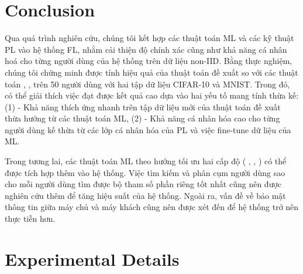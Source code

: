 \documentclass[runningheads]{llncs}
\begin{document}
\section{Conclusion}

Qua quá trình nghiên cứu, chúng tôi kết hợp các thuật toán ML và các kỹ thuật PL vào hệ thống FL, nhằm cải thiện độ chính xác cũng như khả năng cá nhân hoá cho từng người dùng của hệ thống trên dữ liệu non-IID. Bằng thực nghiệm, chúng tôi chứng minh được tính hiệu quả của thuật toán đề xuất  so với các thuật toán , ,  trên 50 người dùng với hai tập dữ liệu CIFAR-10 và MNIST. Trong đó, có thể giải thích việc đạt được kết quả cao dựa vào hai yếu tố mang tính thừa kế: (1) - Khả năng thích ứng nhanh trên tập dữ liệu mới của thuật toán đề xuất thừa hưởng từ các thuật toán ML, (2) - Khả năng cá nhân hóa cao cho từng người dùng kế thừa từ các lớp cá nhân hóa của PL và việc fine-tune dữ liệu của ML.

Trong tương lai, các thuật toán ML theo hướng tối ưu hai cấp độ ( \cite{finn2017model},  \cite{rajeswaran2019meta}, ) có thể được tích hợp thêm vào hệ thống. Việc tìm kiếm và phân cụm người dùng sao cho mỗi người dùng tìm được bộ tham số phần riêng tốt nhất cũng nên được nghiên cứu thêm để tăng hiệu suất của hệ thống. Ngoài ra, vấn đề về bảo mật thông tin giữa máy chủ và máy khách cũng nên được xét đến để hệ thống trở nên thực tiễn hơn.

%
%
%
%
%



\appendix
\section{Experimental Details}
\label{appendix}
\end{document}
